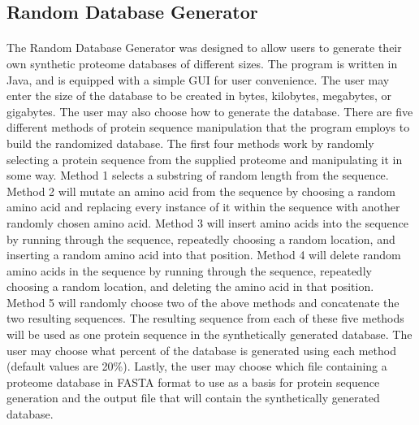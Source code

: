 \documentclass [11pt] {article}
\begin{document}
	\subsection {Random Database Generator}
	
	\paragraph {}
	\qquad The Random Database Generator was designed to allow users to generate their own synthetic proteome databases of different sizes.  The program is written in Java, and is equipped with a simple GUI for user convenience.  The user may enter the size of the database to be created in bytes, kilobytes, megabytes, or gigabytes.  The user may also choose how to generate the database.  There are five different methods of protein sequence manipulation that the program employs to build the randomized database.  The first four methods work by randomly selecting a protein sequence from the supplied proteome and manipulating it in some way.  Method 1 selects a substring of random length from the sequence.  Method 2 will mutate an amino acid from the sequence by choosing a random amino acid and replacing every instance of it within the sequence with another randomly chosen amino acid.  Method 3 will insert amino acids into the sequence by running through the sequence, repeatedly choosing a random location, and inserting a random amino acid into that position.  Method 4 will delete random amino acids in the sequence by running through the sequence, repeatedly choosing a random location, and deleting the amino acid in that position.  Method 5 will randomly choose two of the above methods and concatenate the two resulting sequences.  The resulting sequence from each of these five methods will be used as one protein sequence in the synthetically generated database.  The user may choose what percent of the database is generated using each method (default values are 20\%).  Lastly, the user may choose which file containing a proteome database in FASTA format to use as a basis for protein sequence generation and the output file that will contain the synthetically generated database.
\end{document}
